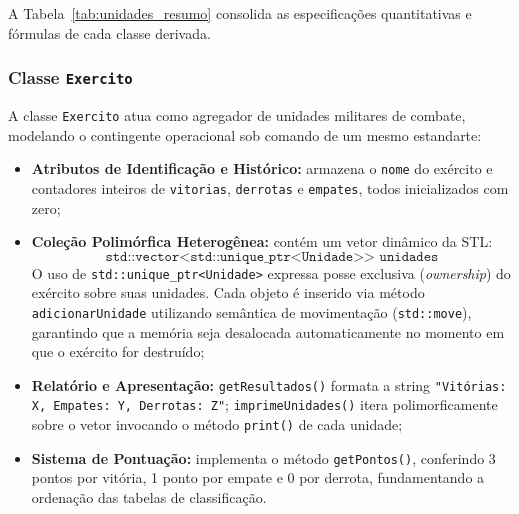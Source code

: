\documentclass[12pt,a4paper]{article}
\begin{document}
A Tabela~\ref{tab:unidades_resumo} consolida as especificações quantitativas e fórmulas de cada classe derivada.

\begin{table}[H]
\centering
\caption{Resumo paramétrico e analítico das subclasses de \texttt{Unidade}.}
\label{tab:unidades_resumo}
\end{table}

\subsubsection{Classe \texttt{Exercito}}
A classe \texttt{Exercito} atua como agregador de unidades militares de combate, modelando o contingente operacional sob comando de um mesmo estandarte:
\begin{itemize}
    \item \textbf{Atributos de Identificação e Histórico:} armazena o \texttt{nome} do exército e contadores inteiros de \texttt{vitorias}, \texttt{derrotas} e \texttt{empates}, todos inicializados com zero;
    \item \textbf{Coleção Polimórfica Heterogênea:} contém um vetor dinâmico da STL:
    \begin{equation}
        \texttt{std::vector<std::unique\_ptr<Unidade>> unidades}
    \end{equation}
    O uso de \texttt{std::unique\_ptr<Unidade>} expressa posse exclusiva (\textit{ownership}) do exército sobre suas unidades. Cada objeto é inserido via método \texttt{adicionarUnidade} utilizando semântica de movimentação (\texttt{std::move}), garantindo que a memória seja desalocada automaticamente no momento em que o exército for destruído;
    \item \textbf{Relatório e Apresentação:} \texttt{getResultados()} formata a string \texttt{"Vitórias: X, Empates: Y, Derrotas: Z"}; \texttt{imprimeUnidades()} itera polimorficamente sobre o vetor invocando o método \texttt{print()} de cada unidade;
    \item \textbf{Sistema de Pontuação:} implementa o método \texttt{getPontos()}, conferindo 3 pontos por vitória, 1 ponto por empate e 0 por derrota, fundamentando a ordenação das tabelas de classificação.
\end{itemize}
\end{document}
